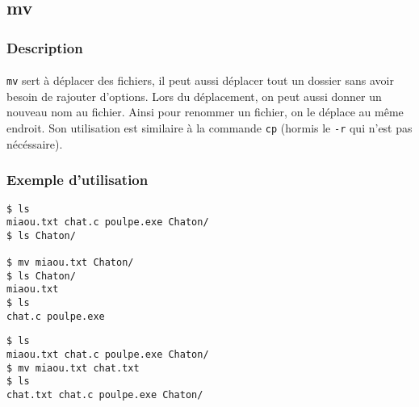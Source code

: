 \subsection{mv}

\subsubsection*{Description}

\paragraph{} \texttt{mv} sert à déplacer des fichiers, il peut aussi déplacer
tout un dossier sans avoir besoin de rajouter d'options. Lors du déplacement,
on peut aussi donner un nouveau nom au fichier. Ainsi pour renommer un fichier,
on le déplace au même endroit. Son utilisation est similaire à la commande
\texttt{cp} (hormis le \texttt{-r} qui n'est pas nécéssaire).

\subsubsection*{Exemple d'utilisation}

\begin{lstlisting}[caption=déplacement d'un fichier]
$ ls
miaou.txt chat.c poulpe.exe Chaton/
$ ls Chaton/

$ mv miaou.txt Chaton/
$ ls Chaton/
miaou.txt
$ ls
chat.c poulpe.exe
\end{lstlisting}

\begin{lstlisting}[caption=renommer un fichier]
$ ls
miaou.txt chat.c poulpe.exe Chaton/
$ mv miaou.txt chat.txt
$ ls
chat.txt chat.c poulpe.exe Chaton/
\end{lstlisting}
